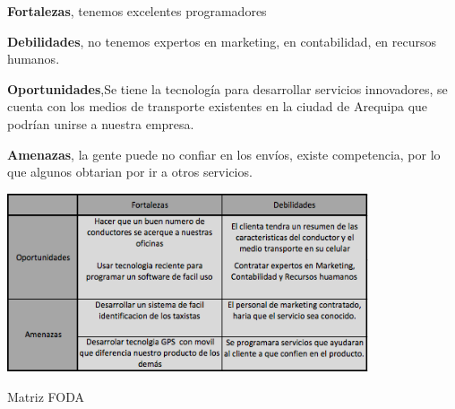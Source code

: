 \textbf{Fortalezas}, tenemos excelentes programadores

\textbf{Debilidades}, no tenemos expertos en marketing, en contabilidad, en recursos humanos.

\textbf{Oportunidades},Se tiene la tecnología para desarrollar servicios innovadores, se cuenta con los medios de transporte existentes en la ciudad de Arequipa que podrían unirse a nuestra empresa.

\textbf{Amenazas}, la gente puede no confiar en los envíos, existe competencia, por lo que algunos obtarian por ir a otros servicios.


\begin{table}[h]
\centering
\label{tab:foda}
\includegraphics[width=0.8\textwidth]{TablaFODA}
\caption{Matriz FODA}
\end{table}